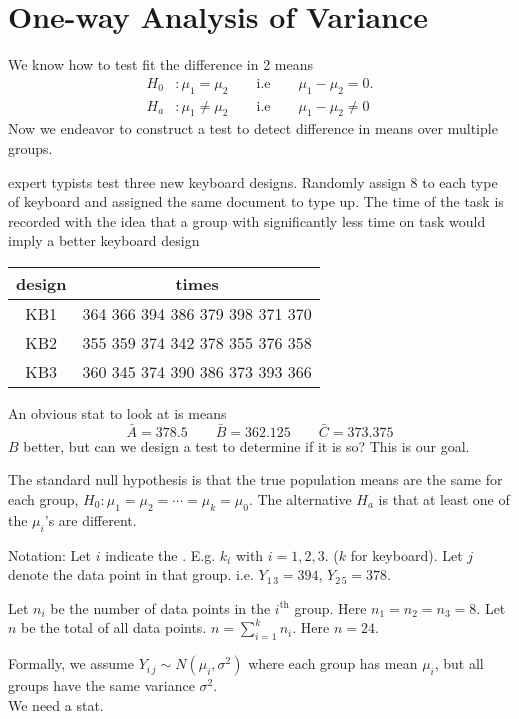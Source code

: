 \chapter{One-way Analysis of Variance}
We know how to test fit the difference in 2 means
\begin{align*}
    H_0 &: \mu_1 = \mu_2 \qquad \text{i.e} \qquad \mu_1 - \mu_2 = 0.\\
    H_a &: \mu_1 \neq \mu_2  \qquad \text{i.e} \qquad \mu_1 - \mu_2 \neq 0
\end{align*}
Now we endeavor to construct a test to detect difference in means over multiple groups.

 expert typists test three new keyboard designs. Randomly assign 8 to each type of keyboard and assigned the same document to type up. The time of the task is recorded with the idea that a group with significantly less time on task would imply a better keyboard design
  \begin{center}
    \begin{tabular}{|c|c|}
         \hline
         design & times\\
         \hline
         KB1 & 364 366 394 386 379 398 371 370\\
         KB2 & 355 359 374 342 378 355 376 358\\
         KB3 & 360 345 374 390 386 373 393 366\\
         \hline
    \end{tabular}
\end{center}
An obvious stat to look at is means
$$\bar{A} = 378.5 \qquad \bar{B} = 362.125 \qquad \bar{C} = 373.375$$
$B$  better, but can we design a test to determine if it is  so? This is our goal.

\nl The standard null hypothesis is that the true population means are the same for each group, $H_0: \mu_1 = \mu_2 = \cdots = \mu_k = \mu_0$. The alternative $H_a$ is that at least one of the $\mu_i$'s are different.

\nl Notation: Let $i$ indicate the . E.g. $k_i$ with $i = 1, 2, 3$. ($k$ for keyboard). Let $j$ denote the data point in that group. i.e. $Y_{1\,3} = 394$, $Y_{2\,5} = 378$.

\nl Let $n_i$ be the number of data points in the $i^{\text{th}}$ group. Here $n_1 = n_2 = n_3 = 8$. Let $n$ be the total of all data points. $n = \sum_{i=1}^k n_i$. Here $n = 24$.

\nl Formally, we assume $Y_{i\,j} \sim N(\mu_i, \sigma^2)$ where each group has mean $\mu_i$, but all groups have the same variance $\sigma^2$.
\\We need a stat.

